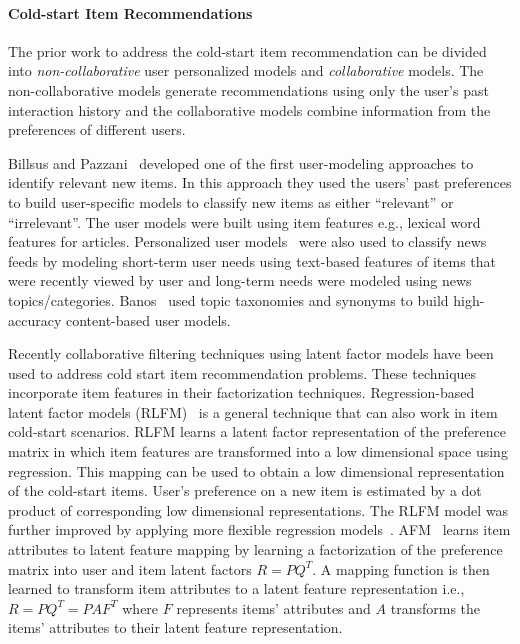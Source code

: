 \iffalse
In
our work, we estimate a single low-rank model, rather than multiple different
low-rank models, that adaptively select a subset of ranks for a rating by a
user on an item by considering the number of ratings provided by the user and
the number of ratings received by the item.
\fi



\paragraph{Cold-start Item Recommendations}
The prior work to address the cold-start item recommendation can be divided 
into \emph{non-collaborative} user personalized models 
and \emph{collaborative} models. The non-collaborative models generate recommendations 
using only the user's past
interaction history and the collaborative models combine information from
the preferences of different users. 

Billsus and Pazzani~\cite{billsus99} developed one of the first user-modeling
approaches to identify relevant new items. In this approach they used the users'
past preferences to build user-specific models to classify new items
as either ``relevant'' or ``irrelevant''. The user models were built using
item features e.g., lexical word features for articles. Personalized 
user models~\cite{rodriguez01} were also used to classify news feeds by modeling short-term user needs 
using text-based features of items that were recently viewed by user and long-term needs were
modeled using news topics/categories. Banos~\cite{banos06}
used topic taxonomies and synonyms to build high-accuracy 
content-based user models. 

Recently collaborative filtering techniques using latent
factor models have been used to address cold start item recommendation
problems. These techniques incorporate item features in their factorization
techniques. Regression-based latent factor models (RLFM)~\cite{agarwal09} is a
general technique that can also work in item cold-start scenarios. 
RLFM learns a latent factor representation of the preference matrix
in which item features are transformed into a low dimensional space using regression.
This mapping can be used to obtain a low dimensional representation of the cold-start
items. User's preference on a new item is estimated by a dot product of
corresponding low dimensional representations. The RLFM model was further
improved by applying more flexible regression models~\cite{zhangrecsys11}.
AFM~\cite{gantner10} learns item attributes to latent feature mapping
by learning a factorization of the preference matrix
into user and item latent factors $R = PQ^T$. A mapping function is then learned
to transform item attributes to a latent feature representation i.e., $R = PQ^T =
PAF^T$ where $F$ represents items' attributes and $A$ transforms the items' attributes 
to their latent feature representation. 

